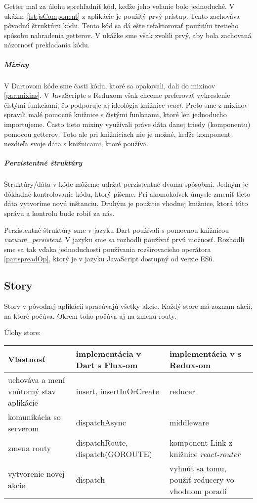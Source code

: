 Getter mal za úlohu sprehľadniť kód, keďže jeho volanie bolo jednoduché.
V ukážke \ref{lst:jsComponent} z aplikácie je použitý prvý prístup. Tento zachováva pôvodnú štruktúru kódu. Tento kód sa dá ešte refaktorovať použitím tretieho spôsobu nahradenia getterov. V ukážke sme však zvolili prvý, aby bola zachovaná názornosť prekladania kódu.

\subparagraph{Mixiny}
V Dartovom kóde sme časti kódu, ktoré sa opakovali, dali do mixinov \ref{par:mixins}. V JavaScripte s Reduxom však chceme preferovať vykreslenie čistými funkciami, čo podporuje aj ideológia knižnice \emph{react}. Preto sme z mixinov spravili malé pomocné knižnice s čistými funkciami, ktoré len jednoducho importujeme. Často tieto mixiny využívali práve dáta danej triedy (komponentu) pomocou getterov. Toto ale pri knižniciach nie je možné, keďže komponent nezdieľa svoje dáta s knižnicami, ktoré používa.

\subparagraph{Perzistentné štruktúry} \NEW{}
Štruktúry/dáta v kóde môžeme udržať perzistentné dvoma spôsobmi. 
Jedným je dôkladné kontrolovanie kódu, ktorý píšeme. Pri akomokoľvek úmysle zmeniť tieto dáta vytvoríme novú inštanciu.
Druhým je použitie vhodnej knižnice, ktorá túto správu a kontrolu bude robiť za nás.

Perzistentné štruktúry sme v jazyku Dart používali s pomocnou knižnicou \emph{vacuum\_persistent}. V jazyku \JS{} sme sa rozhodli používať prvú možnosť. Rozhodli sme sa tak vďaka jednoduchosti používania rozširovacieho operátora \ref{par:spreadOp}, ktorý je v jazyku JavaScript dostupný od verzie ES6.

\subsection{Story}
Story v pôvodnej aplikácii spracúvajú všetky akcie. Každý store má zoznam akcií, na ktoré počúva. Okrem toho počúva aj na zmenu routy.

Úlohy store:\\
\begin{tabular}{| p{4cm} | p{5cm} | p{5cm} |}
 \hline         %
   Vlastnosť & implementácia v Dart s Flux-om & implementácia v \JS{} s Redux-om \\
  \hline
  \hline
   uchováva a mení vnútorný stav aplikácie & 
   insert, insertInOrCreate &
   reducer \\
  \hline
   komunikácia so serverom & 
   dispatchAsync & 
   middleware \\
  \hline
   zmena routy & 
   dispatchRoute, dispatch(GOROUTE) & 
   komponent Link z knižnice \emph{react-router} \\
  \hline
   vytvorenie novej akcie & 
   dispatch & 
   vyhnúť sa tomu, použiť reducery vo vhodnom poradí \\%
  \hline
 \end{tabular}

